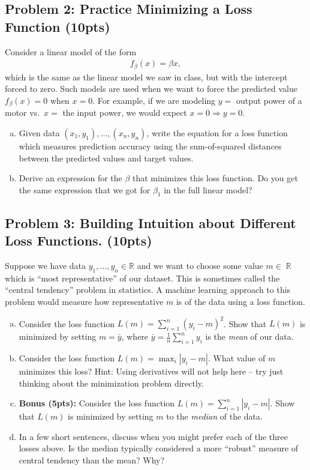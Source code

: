 \documentclass[10pt]{article}
\DeclareMathOperator{\R}{\mathbb{R}}
\begin{document}
\subsection{Problem 2: Practice Minimizing a Loss Function (10pts)}
Consider a linear model of the form
\begin{align*}
f_{\beta}(x) = \beta x,
\end{align*}
which is the same as the linear model we saw in class, but with the intercept forced to zero.  Such models are used when we want to force the predicted value $f_{\beta}(x)=0$ when
$x=0$.  For example, if we are modeling $y=$ output power of a motor
vs.\ $x=$ the input power, we would expect $x=0 \Rightarrow y=0$.
\begin{enumerate}[(a)]
	\item Given data $(x_1,y_1), \ldots, (x_n,y_n)$,
	write the equation for a loss function which measures prediction accuracy using the sum-of-squared distances between the predicted values and target values. 
	
	\item Derive an expression for the $\beta$ that minimizes this loss function. Do you get the same expression that we got for $\beta_1$ in the full linear model? 
\end{enumerate}


\subsection{Problem 3: Building Intuition about Different Loss Functions. (10pts)}
Suppose we have data  $y_1, \ldots, y_n \in \mathbb{R}$ and we want to choose some value $m \in \R$ which is ``most representative'' of our dataset. This is sometimes called the ``central tendency'' problem in statistics. A machine learning approach to this problem would measure how representative $m$ is of the data using a loss function. 
\begin{enumerate}[(a)]
	\item Consider the loss function $L(m) = \sum_{i=1}^n (y_i - m)^2$. Show that $L(m)$ is minimized by setting $m = \bar{y}$, where $\bar{y} = \frac{1}{n}\sum_{i=1}^n y_i$ is the \emph{mean} of our data. 
	\item Consider the loss function $L(m) = \max_i|y_i - m|$. What value of $m$ minimizes this loss? Hint: Using derivatives will not help here -- try just thinking about the minimization problem directly.

	\item \textbf{Bonus (5pts):} Consider the loss function $L(m) = \sum_{i=1}^n |y_i - m|$. Show that $L(m)$ is minimized by setting $m$ to the \emph{median} of the data. 

	
	\item In a few short sentences, discuss when you might prefer each of the three losses above. Is the median typically considered a more ``robust'' measure of central tendency than the mean? Why?
\end{enumerate}
\end{document}
